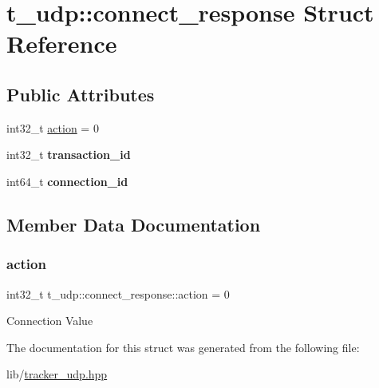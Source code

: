 \hypertarget{structt__udp_1_1connect__response}{}\section{t\+\_\+udp\+:\+:connect\+\_\+response Struct Reference}
\label{structt__udp_1_1connect__response}
\subsection*{Public Attributes}
\begin{DoxyCompactItemize}
\item 
int32\+\_\+t \hyperlink{structt__udp_1_1connect__response_a72371c40b24c52782ef0d03ca61c57e3}{action} = 0
\item 
\mbox{\label{structt__udp_1_1connect__response_af5f97e3b41bd74d238f78a2233bd53d5}} 
int32\+\_\+t {\bfseries transaction\+\_\+id}
\item 
\mbox{\label{structt__udp_1_1connect__response_aa9e3aec7f9a33e92c59bcf548a1d83af}} 
int64\+\_\+t {\bfseries connection\+\_\+id}
\end{DoxyCompactItemize}


\subsection{Member Data Documentation}
\mbox{\label{structt__udp_1_1connect__response_a72371c40b24c52782ef0d03ca61c57e3}} 
\subsubsection{\texorpdfstring{action}{action}}
{\footnotesize\ttfamily int32\+\_\+t t\+\_\+udp\+::connect\+\_\+response\+::action = 0}

Connection Value 

The documentation for this struct was generated from the following file\+:\begin{DoxyCompactItemize}
\item 
lib/\hyperlink{tracker__udp_8hpp}{tracker\+\_\+udp.\+hpp}\end{DoxyCompactItemize}
